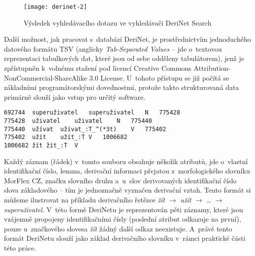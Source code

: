 \begin{figure}[ht]   
    \centering
    \texttt{[image: derinet-2]}  
    \caption{Výsledek vyhledávacího dotazu ve vyhledávači DeriNet Search~\parencite{derinet}}
    \label{derinet-2}
 \end{figure}

Další možnost, jak pracovat s~databází DeriNet, je prostřednictvím
jednoduchého datového formátu TSV (anglicky \emph{Tab-Separated Values}
-- jde o~textovou reprezentaci tabulkových dat, které jsou od sebe
odděleny tabulátorem), jenž je zpřístupněn k~volnému stažení pod licencí
Creative Commons Attribution-NonCommercial-ShareAlike 3.0 License.
U~tohoto přístupu se již počítá se základními programátorskými
dovednostmi, protože takto strukturovaná data primárně slouží jako vstup
pro určitý software.~\parencite{derinet-cz}

\begin{verbatim}
692744  superuživatel   superuživatel   N   775428
775428  uživatel    uživatel    N   775440
775440  užívat  užívat_:T_^(*3t)    V   775402
775402  užít    užít_:T V   1006682
1006682 žít žít_:T  V
\end{verbatim}

Každý záznam (řádek) v~tomto souboru obsahuje několik atributů, jde
o~vlastní identifikační číslo, lemma, derivační informaci přejatou
z~morfologického slovníku MorFlex CZ, značku slovního druhu a~u~slov
derivovaných identifikační číslo slova základového -- tím je jednoznačně
vyznačen derivační vztah. Tento formát si můžeme ilustrovat na příkladu
derivačního řetězce \emph{žít} $\rightarrow$ \emph{užít}
$\rightarrow$ \ldots{} $\rightarrow$ \emph{superuživatel}. V~této
formě DeriNetu je reprezentován pěti záznamy, které jsou vzájemně
propojeny identifikačními čísly (poslední atribut odkazuje na první),
pouze u~značkového slovesa \emph{žít} žádný další odkaz neexistuje.
\parencite{derinet} A~právě tento formát DeriNetu slouží jako základ
derivačního slovníku v~rámci praktické části této práce.
